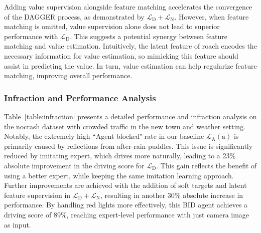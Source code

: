 %
Adding value supervision alongside feature matching accelerates the convergence of the DAGGER process, as demonstrated by $\mathcal{L}_\text{D} + \mathcal{L}_\text{N}$.
However, when feature matching is omitted, value supervision alone does not lead to superior performance with $\mathcal{L}_\text{D}$.
This suggests a potential synergy between feature matching and value estimation. 
Intuitively, the latent feature of roach encodes the necessary information for value estimation, so mimicking this feature should assist in predicting the value. 
In turn, value estimation can help regularize feature matching, improving overall performance.


\subsubsection{Infraction and Performance Analysis}


\hspace{1pc}Table~\ref{table:infraction} presents a detailed performance and infraction analysis on the nocrash dataset with crowded traffic in the new town and weather setting. 
Notably, the extremely high ``Agent blocked" rate in our baseline $\mathcal{L}_\text{A}(\text{a})$ is primarily caused by reflections from after-rain puddles. 
This issue is significantly reduced by imitating expert, which drives more naturally, leading to a 23\% absolute improvement in the driving score for $\mathcal{L}_\text{D}$. 
This gain reflects the benefit of using a better expert, while keeping the same imitation learning approach. 
Further improvements are achieved with the addition of soft targets and latent feature supervision in $\mathcal{L}_\text{D}+\mathcal{L}_\text{N}$, resulting in another 30\% absolute increase in performance. 
By handling red lights more effectively, this BID agent achieves a driving score of 89\%, reaching expert-level performance with just camera image as input.





 